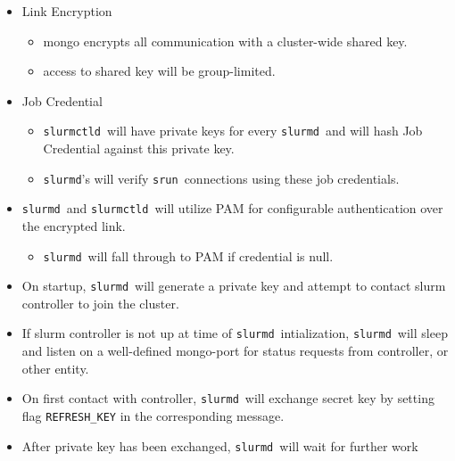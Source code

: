 \documentclass[article,letter,landscape]{seminar}
\newcommand{\slurmd}{{\tt slurmd}}
\newcommand{\slurmctld}{{\tt slurmctld}}
\newcommand{\srun}{{\tt srun}}
\begin{document}
\begin{slide}
  \begin{center}
  \begin{itemize}
  \item Link Encryption
  \begin{itemize}
    \item mongo encrypts all communication with a cluster-wide
          shared key.
    \item access to shared key will be group-limited.
  \end{itemize}
  \item Job Credential
  \begin{itemize}
    \item \slurmctld\ will have private keys for every \slurmd\
          and will hash Job Credential against this private key.
    \item \slurmd 's will verify \srun\ connections using these
          job credentials.
  \end{itemize}
  \item \slurmd\ and \slurmctld\ will utilize PAM for configurable authentication
        over the encrypted link.
  \begin{itemize}
    \item \slurmd\ will fall through to PAM if credential is null.
  \end{itemize}
  \end{itemize}
  \end{center}
\end{slide}


\begin{slide}
  \slideheading{\slurmd\ Initialization}
  \begin{center}
  \begin{itemize}
  \item On startup, \slurmd\ will generate a private key  and
        attempt to contact slurm controller to join the cluster.
  \item If slurm controller is not up at time of \slurmd\ intialization,
        \slurmd\ will sleep and listen on a well-defined mongo-port for status
	requests from controller, or other entity.
  \item On first contact with controller, \slurmd\ will exchange secret key
        by setting flag {\tt REFRESH\_KEY} in the corresponding message.
  \item After private key has been exchanged, \slurmd\ will wait for
        further work
  \end{itemize}
  \end{center}
\end{slide}
\end{document}
